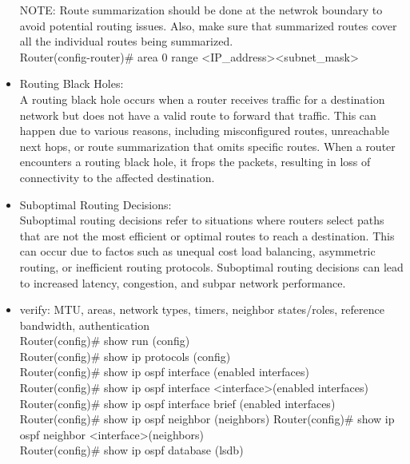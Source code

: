\documentclass{article}
\begin{document}
\begin{itemize}
  		NOTE: Route summarization should be done at the netwrok boundary to avoid potential routing issues. Also, make sure that summarized routes cover all the individual routes being summarized.\\
  		Router(config-router)\# area 0 range \textless IP\_address\textgreater \textless subnet\_mask\textgreater\\
  	\item[] Routing Black Holes:\\
  		A routing black hole occurs when a router receives traffic for a destination network but does not have a valid route to forward that traffic. This can happen due to various reasons, including misconfigured routes, unreachable next hops, or route summarization that omits specific routes. When a router encounters a routing black hole, it frops the packets, resulting in loss of connectivity to the affected destination.
  	\item[] Suboptimal Routing Decisions:\\
  		Suboptimal routing decisions refer to situations where routers select paths that are not the most efficient or optimal routes to reach a destination. This can occur due to factos such as unequal cost load balancing, asymmetric routing, or inefficient routing protocols. Suboptimal routing decisions can lead to increased latency, congestion, and subpar network performance.
  		
  	\item[] verify: MTU, areas, network types, timers, neighbor states/roles, reference bandwidth, authentication\\
  		Router(config)\# show run (config)\\
  		Router(config)\# show ip protocols (config)\\
  		
  		Router(config)\# show ip ospf interface (enabled interfaces)\\
  		Router(config)\# show ip ospf interface \textless interface\textgreater (enabled interfaces)\\
  		Router(config)\# show ip ospf interface brief (enabled interfaces)\\
  		
  		Router(config)\# show ip ospf neighbor (neighbors)
  		Router(config)\# show ip ospf neighbor \textless interface\textgreater (neighbors)\\
  		
  		Router(config)\# show ip ospf database (lsdb)\\
  		

\end{itemize}
\end{document}
